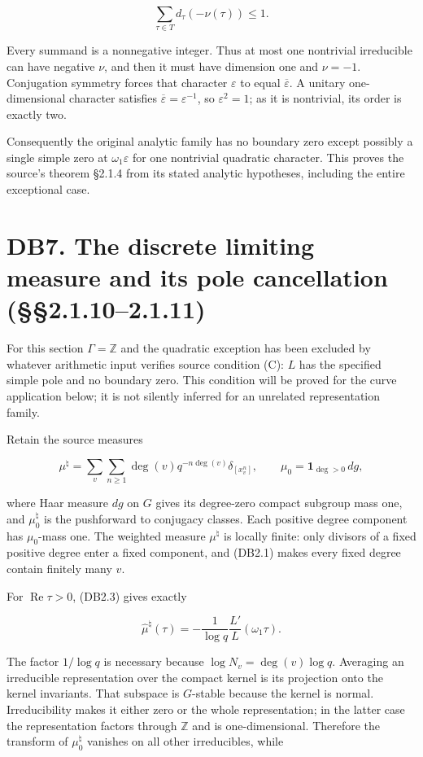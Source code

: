 \documentclass[
]{report}
\begin{document}
\[
 \sum_{\tau\in T}d_\tau(-\nu(\tau))\leq1.
 \tag{DB6.2}
\]

Every summand is a nonnegative integer. Thus at most one nontrivial
irreducible can have negative \(\nu\), and then it must have dimension
one and \(\nu=-1\). Conjugation symmetry forces that character
\(\varepsilon\) to equal \(\overline\varepsilon\). A unitary
one-dimensional character satisfies
\(\overline\varepsilon=\varepsilon^{-1}\), so \(\varepsilon^2=1\); as it
is nontrivial, its order is exactly two.

Consequently the original analytic family has no boundary zero except
possibly a single simple zero at \(\omega_1\varepsilon\) for one
nontrivial quadratic character. This proves the source's theorem §2.1.4
from its stated analytic hypotheses, including the entire exceptional
case.

\section{DB7. The discrete limiting measure and its pole cancellation
(§§2.1.10--2.1.11)}\label{db7.-the-discrete-limiting-measure-and-its-pole-cancellation-2.1.102.1.11}

For this section \(\Gamma=\mathbb Z\) and the quadratic exception has
been excluded by whatever arithmetic input verifies source condition
(C): \(L\) has the specified simple pole and no boundary zero. This
condition will be proved for the curve application below; it is not
silently inferred for an unrelated representation family.

Retain the source measures

\[
 \mu^{\natural}=\sum_v\sum_{n\geq1}
      \deg(v)q^{-n\deg(v)}\delta_{[x_v^n]},
 \qquad
 \mu_0=\mathbf1_{\deg>0}\,dg,
 \tag{DB7.1}
\]

where Haar measure \(dg\) on \(G\) gives its degree-zero compact
subgroup mass one, and \(\mu_0^\natural\) is the pushforward to
conjugacy classes. Each positive degree component has \(\mu_0\)-mass
one. The weighted measure \(\mu^\natural\) is locally finite: only
divisors of a fixed positive degree enter a fixed component, and (DB2.1)
makes every fixed degree contain finitely many \(v\).

For \(\operatorname{Re}\tau>0\), (DB2.3) gives exactly

\[
 \widehat\mu^{\natural}(\tau)
 =-\frac1{\log q}\frac{L'}L(\omega_1\tau).
 \tag{DB7.2}
\]

The factor \(1/\log q\) is necessary because \(\log N_v=\deg(v)\log q\).
Averaging an irreducible representation over the compact kernel is its
projection onto the kernel invariants. That subspace is \(G\)-stable
because the kernel is normal. Irreducibility makes it either zero or the
whole representation; in the latter case the representation factors
through \(\mathbb Z\) and is one-dimensional. Therefore the transform of
\(\mu_0^\natural\) vanishes on all other irreducibles, while
\end{document}
